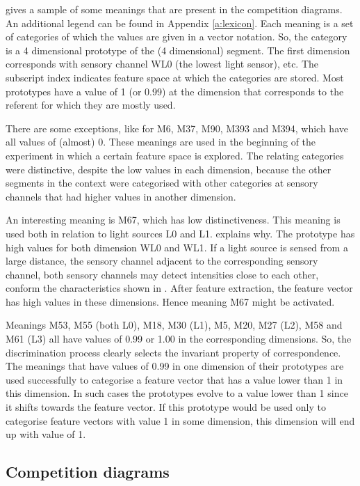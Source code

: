  gives a sample of some meanings that are present in the competition diagrams. An additional legend can be found in Appendix \ref{a:lexicon}. Each meaning is a set of categories of which the values are given in a vector notation. So, the category is a 4 dimensional prototype of the (4 dimensional) segment. The first dimension corresponds with sensory channel WL0 (the lowest light sensor), etc. The subscript index indicates feature space at which the categories are stored. Most prototypes have a value of 1 (or 0.99) at the dimension that corresponds to the referent for which they are mostly used. 

There are some exceptions, like for M6, M37, M90, M393 and M394, which have all values of (almost) 0. These meanings are used in the beginning of the experiment in which a certain feature space is explored. The relating categories were distinctive, despite the low values in each dimension, because the other segments in the context were categorised with other categories at sensory channels that had higher values in another dimension.

An interesting meaning is M67, which has low distinctiveness. This meaning is used both in relation to light sources L0 and L1.  explains why. The prototype has high values for both dimension WL0 and WL1. If a light source is sensed from a large distance, the sensory channel adjacent to the corresponding sensory channel, both sensory channels may detect intensities close to each other, conform the characteristics shown in . After feature extraction, the feature vector has high values in these dimensions. Hence meaning M67 might be activated. 

Meanings M53, M55 (both L0), M18, M30 (L1), M5, M20, M27 (L2), M58 and M61 (L3) all have values of 0.99 or 1.00 in the corresponding dimensions.  So, the discrimination process clearly selects the invariant property of correspondence. The meanings that have values of 0.99 in one dimension of their prototypes are used successfully to categorise a feature vector that has a value lower than 1 in this dimension. In such cases the prototypes evolve to a value lower than 1 since it shifts towards the feature vector. If this prototype would be used only to categorise feature vectors with value 1 in some dimension, this dimension will end up with value of 1.


\subsection{Competition diagrams}\label{s:basic:comp}

